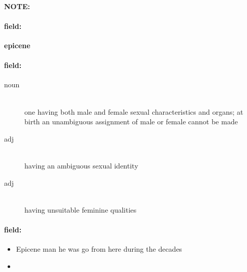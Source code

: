 \documentclass[12pt]{article}
\newenvironment{note}{\paragraph{NOTE:}}{}
\newenvironment{field}{\paragraph{field:}}{}
\begin{document}
\begin{note}
\begin{field}
\textbf{\large epicene}
\end{field}


\begin{field}
\begin{description}
\item[noun] \hfill \\ 
one having both male and female sexual characteristics and organs; at birth an unambiguous assignment of male or female cannot be made

\item[adj] \hfill \\ 
having an ambiguous sexual identity

\item[adj] \hfill \\ 
having unsuitable feminine qualities

\end{description}
\end{field}

\begin{field}
\begin{itemize}
\item Epicene man he was go from here during the decades
\item 
\end{itemize}
\end{field}
\end{note}
\end{document}
